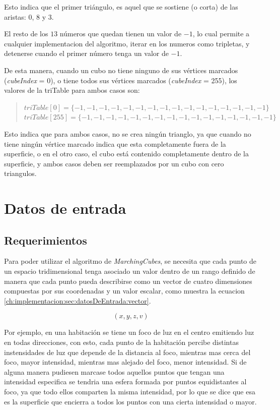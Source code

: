 Esto indica que el primer triángulo, es aquel que se sostiene (o corta) de las aristas: $0$, $8$ y $3$.

El resto de los $13$ números que quedan tienen un valor de $-1$, lo cual permite a cualquier implementacion del algoritmo, iterar en los numeros como tripletas, y detenerse cuando el primer número tenga un valor de $-1$.

De esta manera, cuando un cubo no tiene ninguno de sus vértices marcados (\emph{cubeIndex} = 0), o tiene todos sus vértices marcados (\emph{cubeIndex} = 255), los valores de la triTable para ambos casos son:

\begin{quote}
	$triTable[0]	= \{-1, -1, -1, -1, -1, -1, -1, -1, -1, -1, -1, -1, -1, -1, -1, -1\}$\\
	$triTable[255]	= \{-1, -1, -1, -1, -1, -1, -1, -1, -1, -1, -1, -1, -1, -1, -1, -1\}$
\end{quote}

Esto indica que para ambos casos, no se crea ningún trianglo, ya que cuando no tiene ningún vértice marcado indica que esta completamente fuera de la superficie, o en el otro caso, el cubo está contenido completamente dentro de la superficie, y ambos casos deben ser reemplazados por un cubo con cero triangulos.

\section{Datos de entrada}
\label{ch:implementacion:sec:datosDeEntrada}

\subsection{Requerimientos}
\label{ch:implementacion:sec:datosDeEntrada:subsec:requerimientos}

Para poder utilizar el algoritmo de \emph{MarchingCubes}, se necesita que cada punto de un espacio tridimensional tenga asociado un valor dentro de un rango definido de manera que cada punto pueda describirse como un vector de cuatro dimensiones compuestas por sus coordenadas y un valor escalar, como muestra la ecuacion \ref{ch:implementacion:sec:datosDeEntrada:vector}.

\begin{equation}
\label{ch:implementacion:sec:datosDeEntrada:vector}
	(x,y,z,v)
\end{equation}

Por ejemplo, en una habitación se tiene un foco de luz en el centro emitiendo luz en todas direcciones, con esto, cada punto de la habitación percibe distintas instensidades de luz que depende de la distancia al foco, mientras mas cerca del foco, mayor intensidad, mientras mas alejado del foco, menor intensidad. Si de alguna manera pudiesen marcase todos aquellos puntos que tengan una intensidad especifica se tendria una esfera formada por puntos equidistantes al foco, ya que todo ellos comparten la misma intensidad, por lo que se dice que esa es la superficie que encierra a todos los puntos con una cierta intensidad o mayor.


